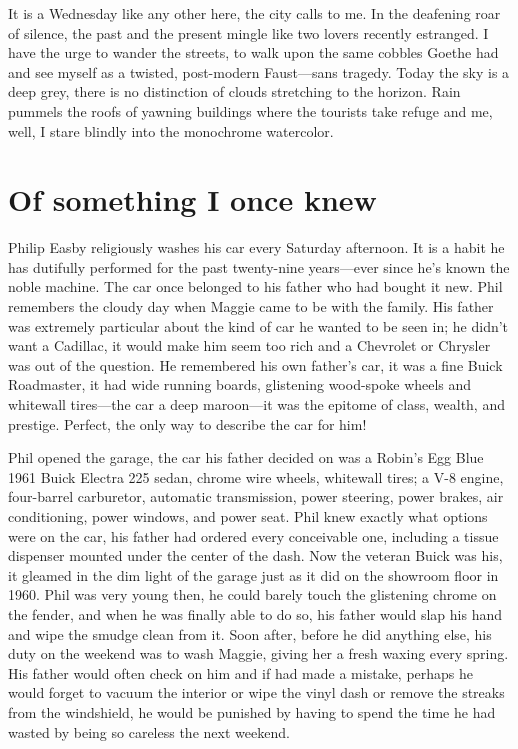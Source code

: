 It is a Wednesday like any other here, the city calls to me. In the
deafening roar of silence, the past and the present mingle like two
lovers recently estranged. I have the urge to wander the streets, to
walk upon the same cobbles Goethe had and see myself as a twisted,
post-modern Faust---sans tragedy. Today the sky is a deep grey, there is
no distinction of clouds stretching to the horizon. Rain pummels the
roofs of yawning buildings where the tourists take refuge and me, well,
I stare blindly into the monochrome watercolor.

\section{Of something I once knew}\label{of-something-i-once-knew}

Philip Easby religiously washes his car every Saturday afternoon. It is
a habit he has dutifully performed for the past twenty-nine years---ever
since he's known the noble machine. The car once belonged to his father
who had bought it new. Phil remembers the cloudy day when Maggie came to
be with the family. His father was extremely particular about the kind
of car he wanted to be seen in; he didn't want a Cadillac, it would make
him seem too rich and a Chevrolet or Chrysler was out of the question.
He remembered his own father's car, it was a fine Buick Roadmaster, it
had wide running boards, glistening wood-spoke wheels and whitewall
tires---the car a deep maroon---it was the epitome of class, wealth, and
prestige. Perfect, the only way to describe the car for him!

Phil opened the garage, the car his father decided on was a Robin's Egg
Blue 1961 Buick Electra 225 sedan, chrome wire wheels, whitewall tires;
a V-8 engine, four-barrel carburetor, automatic transmission, power
steering, power brakes, air conditioning, power windows, and power seat.
Phil knew exactly what options were on the car, his father had ordered
every conceivable one, including a tissue dispenser mounted under the
center of the dash. Now the veteran Buick was his, it gleamed in the dim
light of the garage just as it did on the showroom floor in 1960. Phil
was very young then, he could barely touch the glistening chrome on the
fender, and when he was finally able to do so, his father would slap his
hand and wipe the smudge clean from it. Soon after, before he did
anything else, his duty on the weekend was to wash Maggie, giving her a
fresh waxing every spring. His father would often check on him and if
had made a mistake, perhaps he would forget to vacuum the interior or
wipe the vinyl dash or remove the streaks from the windshield, he would
be punished by having to spend the time he had wasted by being so
careless the next weekend.

